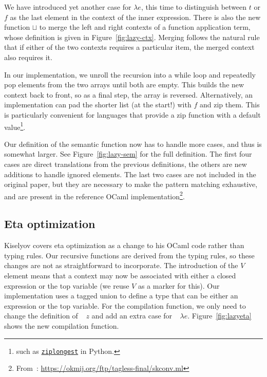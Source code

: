 \documentclass[conference]{IEEEtran}
\DeclareMathOperator{\lazyeta}{lazy_\eta}
\begin{document}
We have introduced yet another case for $\lambda e$, this time to distinguish between $t$ or $f$ as the last element in the context of the inner expression.
There is also the new function $\sqcup$ to merge the left and right contexts of a function application term, whose definition is given in Figure~\ref{fig:lazy-ctx}.
Merging follows the natural rule that if either of the two contexts requires a particular item, the merged context also requires it.

In our implementation, we unroll the recursion into a while loop and repeatedly pop elements from the two arrays until both are empty.
This builds the new context back to front, so as a final step, the array is reversed.
Alternatively, an implementation can pad the shorter list (at the start!) with $f$ and zip them.
This is particularly convenient for languages that provide a zip function with a default value\footnote{such as \href{https://docs.python.org/3/library/itertools.html\#itertools.zip\_longest}{\texttt{ziplongest}} in Python.}.

Our definition of the semantic function now has to handle more cases, and thus is somewhat larger.
See Figure~\ref{fig:lazy-sem} for the full definition.
The first four cases are direct translations from the previous definitions, the others are new additions to handle ignored elements.
The last two cases are not included in the original paper, but they are necessary to make the pattern matching exhaustive, and are present in the reference OCaml implementation\footnote{From~\cite{kiselyov_lambda_2018}: \url{https://okmij.org/ftp/tagless-final/skconv.ml}}.

\subsection{Eta optimization}
Kiselyov covers eta optimization as a change to his OCaml code rather than typing rules.
Our recursive functions are derived from the typing rules, so these changes are not as straightforward to incorporate.
The introduction of the $V$ element means that a context may now be associated with either a closed expression or the top variable (we reuse $V$ as a marker for this).
Our implementation uses a tagged union to define a type that can be either an expression or the top variable.
For the compilation function, we only need to change the definition of $\lazyeta \ z$ and add an extra case for $\lazyeta \ \lambda e$.
Figure~\ref{fig:lazyeta} shows the new compilation function.
\end{document}
